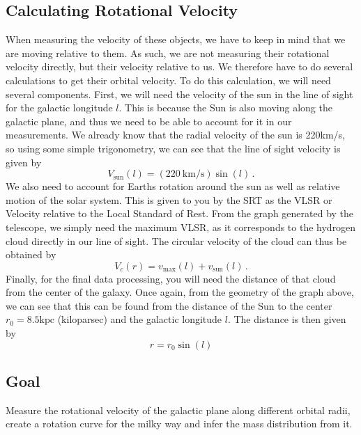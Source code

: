 \subsection{Calculating Rotational Velocity}
When measuring the velocity of these objects, we have to keep in mind that we are moving relative to them. As such, we are not measuring their rotational velocity directly, but their velocity relative to us. We therefore have to do several calculations to get their orbital velocity. To do this calculation, we will need several components. First, we will need the velocity of the sun in the line of sight for the galactic longitude $l$. This is because the Sun is also moving along the galactic plane, and thus we need to be able to account for it in our measurements. We already know that the radial velocity of the sun is 220km/s, so using some simple trigonometry, we can see that the line of sight velocity is given by
\begin{equation}
 V_\textrm{sun}(l) = (220\:\mathrm{km}/\mathrm{s}) \sin(l) \,.
\end{equation}
We also need to account for Earths rotation around the sun as well as relative motion of the solar system. This is given to you by the SRT as the VLSR or Velocity relative to the Local Standard of Rest. From the graph generated by the telescope, we simply need the maximum VLSR, as it corresponds to the hydrogen cloud directly in our line of sight. The circular velocity of the cloud can thus be obtained by
\begin{equation}
 V_c(r) = v_\textrm{max} (l) + v_\textrm{sun}(l) \,.
\end{equation}
Finally, for the final data processing, you will need the distance of that cloud from the center of the galaxy. Once again, from the geometry of the graph above, we can see that this can be found from the distance of the Sun to the center $r_0 = 8.5\textrm{kpc}$ (kiloparsec) and the galactic longitude $l$. The distance is then given by
\begin{equation}
 r = r_0 \sin(l)
\end{equation}




\subsection{Goal}
Measure the rotational velocity of the galactic plane along different orbital radii, create a rotation curve for the milky way and infer the mass distribution from it.
